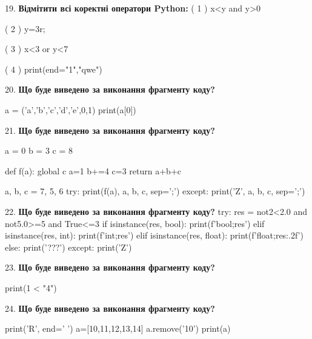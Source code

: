 \documentclass[11pt]{article}
\begin{document}
\par\vspace{5mm}

19. %
\textbf{Відмітити всі коректні оператори Python:}
( 1 ) x<y and y>0

( 2 ) y=3^^2;

( 3 ) x<3 or y<7

( 4 ) print(end="1","qwe")
\par\vspace{5mm}

20. \textbf{Що буде виведено за виконання фрагменту коду?}

a = ('a','b','c','d','e',0,1)
print(a[0])

\par\vspace{5mm}

21. \textbf{Що буде виведено за виконання фрагменту коду?}

a = 0
b = 3
c = 8

def f(a):
global c    a=1
    b+=4
    c=3
    return a+b+c

a, b, c = 7, 5, 6
try:
    print(f(a), a, b, c, sep=';')
except:
    print('Z', a, b, c, sep=';')
\par\vspace{5mm}

22. \textbf{Що буде виведено за виконання фрагменту коду?}
try:
    res = not2<2.0 and not5.0>=5 and True<=3
    if isinstance(res, bool):
        print(f'bool;{res}')
    elif isinstance(res, int):
        print(f'int;{res}')
    elif isinstance(res, float):
        print(f'float;{res:.2f}')
    else:
        print('???')
except:
    print('Z')
\par\vspace{5mm}

23. \textbf{Що буде виведено за виконання фрагменту коду?}

print(1 < "4")
\par\vspace{5mm}

24. \textbf{Що буде виведено за виконання фрагменту коду?}

print('R', end=' ')
a=[10,11,12,13,14]
a.remove('10')
print(a)

\par\vspace{5mm}
\end{document}
